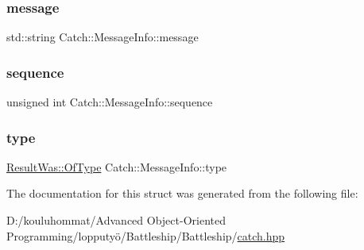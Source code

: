 \subsubsection{\texorpdfstring{message}{message}}
{\footnotesize\ttfamily std\+::string Catch\+::\+Message\+Info\+::message}

\mbox{\label{struct_catch_1_1_message_info_a7f4f57ea21e50160adefce7b68a781d6}} 
\subsubsection{\texorpdfstring{sequence}{sequence}}
{\footnotesize\ttfamily unsigned int Catch\+::\+Message\+Info\+::sequence}

\mbox{\label{struct_catch_1_1_message_info_ae928b9117465c696e45951d9d0284e78}} 
\subsubsection{\texorpdfstring{type}{type}}
{\footnotesize\ttfamily \mbox{\hyperlink{struct_catch_1_1_result_was_a624e1ee3661fcf6094ceef1f654601ef}{Result\+Was\+::\+Of\+Type}} Catch\+::\+Message\+Info\+::type}



The documentation for this struct was generated from the following file\+:\begin{DoxyCompactItemize}
\item 
D\+:/kouluhommat/\+Advanced Object-\/\+Oriented Programming/lopputyö/\+Battleship/\+Battleship/\mbox{\hyperlink{catch_8hpp}{catch.\+hpp}}\end{DoxyCompactItemize}
